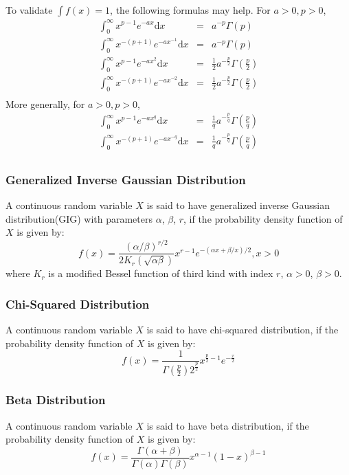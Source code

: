 \documentclass[11pt]{article}
\begin{document}
To validate $\int{f(x)}=1$, the following formulas may help. For $a>0, p>0$,
\begin{eqnarray*}
\int_{0}^{\infty}x^{p-1}e^{-ax}\mathrm dx &=& a^{-p}\Gamma(p) \\
\int_{0}^{\infty}x^{-(p+1)}e^{-ax^{-1}}\mathrm dx &=& a^{-p}\Gamma(p) \\
\int_{0}^{\infty}x^{p-1}e^{-ax^2}\mathrm dx &=& \frac{1}{2}a^{-\frac{p}{2}}\Gamma(\frac{p}{2}) \\
\int_{0}^{\infty}x^{-(p+1)}e^{-ax^{-2}}\mathrm dx &=& \frac{1}{2}a^{-\frac{p}{2}}\Gamma(\frac{p}{2}) \\
\end{eqnarray*}
More generally, for $a>0, p>0$,
\begin{eqnarray*}
\int_{0}^{\infty}x^{p-1}e^{-ax^q}\mathrm dx &=& \frac{1}{q}a^{-\frac{p}{q}}\Gamma(\frac{p}{q}) \\
\int_{0}^{\infty}x^{-(p+1)}e^{-ax^{-q}}\mathrm dx &=& \frac{1}{q}a^{-\frac{p}{q}}\Gamma(\frac{p}{q}) \\
\end{eqnarray*}
\subsubsection{Generalized Inverse Gaussian Distribution}
A continuous random variable $X$ is said to have generalized inverse Gaussian distribution(GIG) with parameters $\alpha$, $\beta$, $r$, if the probability density function of $X$ is given by:
\[f(x) = \frac{(\alpha / \beta)^{r/2}}{2 K_r(\sqrt{\alpha\beta})} x^{r-1} e^{-(\alpha x + \beta/x)/2}, x > 0\]
where $K_r$ is a modified Bessel function of third kind with index $r$, $\alpha > 0$, $\beta > 0$.

\subsubsection{Chi-Squared Distribution}
A continuous random variable $X$ is said to have chi-squared distribution, if the probability density function of $X$ is given by:
\[f(x) = \frac{1}{\Gamma(\frac{p}{2})2^{\frac{p}{2}}} x^{\frac{p}{2} - 1} e^{-\frac{x}{2}}\]

\subsubsection{Beta Distribution}
A continuous random variable $X$ is said to have beta distribution, if the probability density function of $X$ is given by:
\[f(x) = \frac{\Gamma(\alpha + \beta)}{\Gamma(\alpha)\Gamma(\beta)} x^{\alpha - 1} (1-x)^{\beta - 1}\]
\end{document}
